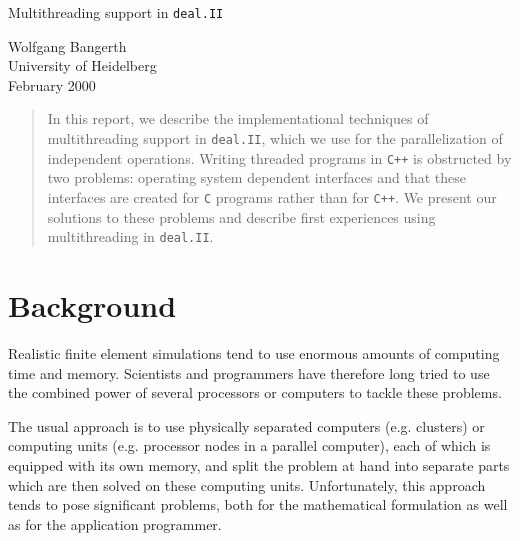 \documentclass[11pt]{article}
\begin{document}
\begin{center}
  \begin{huge}
    Multithreading support in \texttt{deal.II}
  \end{huge}

  \vspace*{0.5cm}

  \begin{large}
    Wolfgang Bangerth\\
    University of Heidelberg\\[12pt]
    February 2000
  \end{large}
\end{center}


\begin{abstract}
  In this report, we describe the implementational techniques of
  multithreading support in \texttt{deal.II}, which we use for the
  parallelization of independent operations. Writing threaded programs in
  \texttt{C++} is obstructed by two problems: operating system dependent
  interfaces and that these interfaces are created for \texttt{C} programs
  rather than for \texttt{C++}. We present our solutions to these problems and
  describe first experiences using multithreading in \texttt{deal.II}.
\end{abstract}


\section{Background}

Realistic finite element simulations tend to use enormous amounts of computing
time and memory. Scientists and programmers have therefore long tried to use
the combined power of several processors or computers to tackle these
problems.

The usual approach is to use physically separated computers (e.g. clusters) or
computing units (e.g. processor nodes in a parallel computer), each of which
is equipped with its own memory, and split the problem at hand into separate
parts which are then solved on these computing units. Unfortunately, this
approach tends to pose significant problems, both for the mathematical
formulation as well as for the application programmer.
\end{document}

